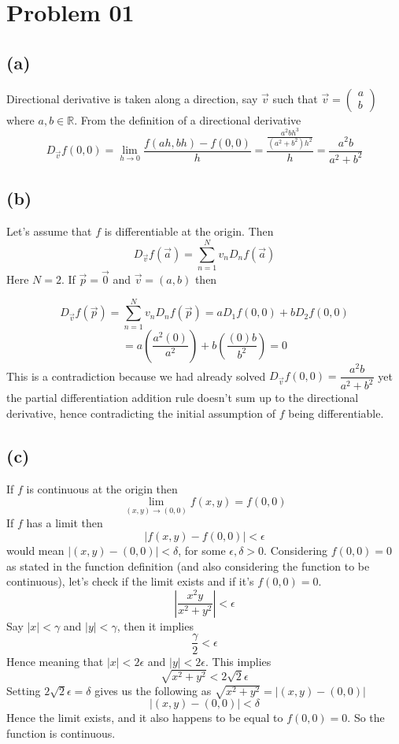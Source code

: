 \documentclass[letter]{article}
\title{}
\author{Ahmed Saad Sabit, Rice University}
\date{\today}
\begin{document}
\maketitle

\section*{Problem 01} 
\subsection*{(a)}
Directional derivative is taken along a direction, say $\vec{v}$ such that $\vec{v} = \begin{pmatrix} a \\ b \end{pmatrix} $ where $a,b \in \mathbb{R}$. From the definition of a directional derivative 
\[
	D_{\vec{v}} f(0,0) =  
	\lim_{h \to {0}} 
	\frac{f(ah,bh) - f(0,0)}{h} = 
	\frac{
\frac{a^2 b h^3}{(a^2 + b^2) h^2}
	}{h} = 
	\frac{a^2b}{a^2 + b^2}
\]

\subsection*{(b)}
Let's assume that $f$ is differentiable at the origin. Then 
\[
	D_{\vec{v}} f(\vec{a}) = \sum_{n=1}^{N} v_n D_n f(\vec{a})
\]
Here $N = 2$. If $\vec{p} = \vec{0} $ and $\vec{v} = (a,b)$ then

\[
	D_{\vec{v}} f(\vec{p}) = \sum_{n=1}^{N} v_n D_n f(\vec{p}) =  
	a D_1 f(0,0) + b D_2 f(0,0)
\]
\[
= a \left( \frac{a^2 ( 0) }{a^2  }\right) + 
b \left( \frac{(0) b}{b^2}\right) = 0
\]
This is a contradiction because we had already solved $D_{\vec{v}} f(0,0) = \dfrac{a^2b}{a^2+b^2}$ yet the partial differentiation addition rule doesn't sum up to the directional derivative, hence contradicting the initial assumption of $f$ being differentiable. 

\subsection*{(c)} 
If $f$ is continuous at the origin then 
\[
\lim_{(x,y) \to (0,0)}  f(x,y) = f(0,0)
\] 
If $f$ has a limit then 
\[
 |f(x,y) - f(0,0)| < \epsilon
\]
would mean $|(x,y) - (0,0)| < \delta$,  for some $\epsilon,\delta > 0$. Considering $f(0,0) = 0$ as stated in the function definition (and also considering the function to be continuous), let's check if the limit exists and if it's $f(0,0) = 0$. 
\[
\left| 
\frac{x^2 y }{x^2+y^2} 
\right| < \epsilon
\] 
 Say  $|x| < \gamma$ and $|y| < \gamma$, then it implies $$\frac{\gamma}{2 }  < \epsilon$$ 
 Hence meaning that $|x| < 2 \epsilon$ and $|y| < 2 \epsilon$. This implies 
 \[
 \sqrt{x^2 + y^2}  < 2\sqrt{2} \epsilon
 \] 
Setting $2 \sqrt{2}  \epsilon = \delta$ gives us the following as $\sqrt{x^2+y^2}  = | (x,y) - (0,0)| $
\[
| (x,y) - (0,0 )| < \delta 
\] 
Hence the limit exists, and it also happens to be equal to $f(0,0) = 0$. So the function is continuous.
\end{document}
